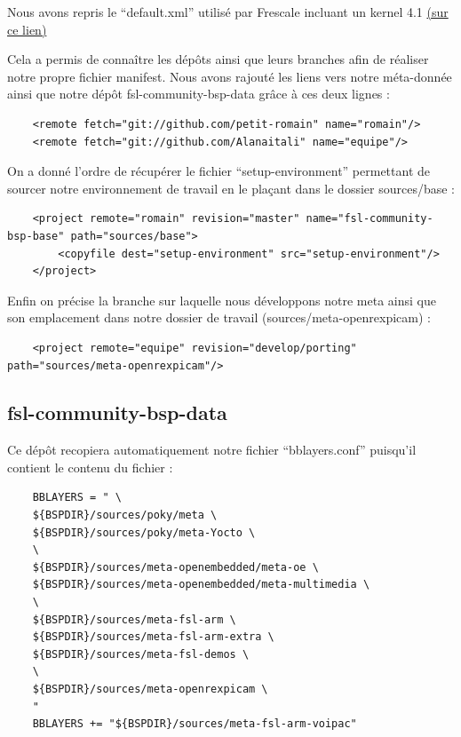 Nous avons repris le “default.xml” utilisé par Frescale incluant un kernel 4.1
\href{http://git.freescale.com/git/cgit.cgi/imx/fsl-arm-yocto-bsp.git/tree/default.xml?h=imx-4.1-krogoth}
{(sur ce lien)}

Cela a permis de connaître les dépôts ainsi que leurs branches afin de réaliser notre
propre fichier manifest. Nous avons rajouté les liens vers notre méta-donnée ainsi que
notre dépôt fsl-community-bsp-data grâce à ces deux lignes : \medskip

\begin{lstlisting}
    <remote fetch="git://github.com/petit-romain" name="romain"/>
    <remote fetch="git://github.com/Alanaitali" name="equipe"/>    
\end{lstlisting}

On a donné l’ordre de récupérer le fichier “setup-environment” permettant de sourcer notre
environnement de travail en le plaçant dans le dossier sources/base : \medskip 

\begin{lstlisting}
    <project remote="romain" revision="master" name="fsl-community-bsp-base" path="sources/base">
        <copyfile dest="setup-environment" src="setup-environment"/>
    </project>
\end{lstlisting}

Enfin on précise la branche sur laquelle nous développons notre meta ainsi que son
emplacement dans notre dossier de travail (sources/meta-openrexpicam) :

\begin{lstlisting}
    <project remote="equipe" revision="develop/porting" path="sources/meta-openrexpicam"/>
\end{lstlisting}

\subsection{fsl-community-bsp-data}

Ce dépôt recopiera automatiquement notre fichier “bblayers.conf” puisqu’il
contient le contenu du fichier : 

\begin{lstlisting}
    BBLAYERS = " \
    ${BSPDIR}/sources/poky/meta \
    ${BSPDIR}/sources/poky/meta-Yocto \
    \
    ${BSPDIR}/sources/meta-openembedded/meta-oe \
    ${BSPDIR}/sources/meta-openembedded/meta-multimedia \
    \
    ${BSPDIR}/sources/meta-fsl-arm \
    ${BSPDIR}/sources/meta-fsl-arm-extra \
    ${BSPDIR}/sources/meta-fsl-demos \
    \
    ${BSPDIR}/sources/meta-openrexpicam \
    "
    BBLAYERS += "${BSPDIR}/sources/meta-fsl-arm-voipac"
\end{lstlisting}

